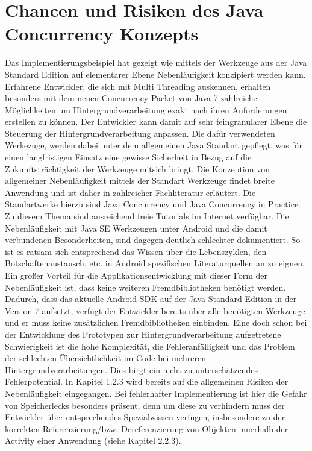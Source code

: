 \documentclass[12pt,oneside,a4paper,bibtotoc,liststotoc]{scrreprt}
\begin{document}
\section{Chancen und Risiken des Java Concurrency Konzepts}
Das Implementierungsbeispiel hat gezeigt wie mittels der Werkzeuge aus der Java Standard Edition auf elementarer Ebene Nebenläufigkeit konzipiert werden kann. Erfahrene Entwickler, die sich mit Multi Threading auskennen, erhalten besonders mit dem neuen Concurrency Packet von Java 7 zahlreiche Möglichkeiten um Hintergrundverarbeitung exakt nach ihren Anforderungen erstellen zu können. Der Entwickler kann damit auf sehr feingranularer Ebene die Steuerung der Hintergrundverarbeitung anpassen. Die dafür verwendeten Werkezuge, werden dabei unter dem allgemeinen Java Standart gepflegt, was für einen langfristigen Einsatz eine gewisse Sicherheit in Bezug auf die Zukunftsträchtigkeit der Werkzeuge mitsich bringt. Die Konzeption von allgemeiner Nebenläufigkeit mittels der Standart Werkzeuge findet breite Anwendung und ist daher in zahlreicher Fachliteratur erläutert. Die Standartwerke hierzu sind Java Concurrency und Java Concurrency in Practice.  Zu diesem Thema sind ausreichend freie Tutorials im Internet verfügbar. Die Nebenläufigkeit mit Java SE Werkzeugen unter Android und die damit verbundenen Besonderheiten, sind dagegen deutlich schlechter dokumentiert. So ist es ratsam sich entsprechend das Wissen über die Lebenszyklen, den Botschaftenaustausch, etc. in Android spezifischen Literaturquellen an zu eignen.
Ein großer Vorteil für die Applikationsentwicklung mit dieser Form der Nebenläufigkeit ist, dass keine weiteren Fremdbibliotheken benötigt werden. Dadurch, dass das aktuelle Android SDK auf der Java Standard Edition in der Version 7 aufsetzt, verfügt der Entwickler bereits über alle benötigten Werkzeuge und er muss keine zusätzlichen Fremdbibliotheken einbinden.
Eine doch schon bei der Entwicklung des Prototypen zur Hintergrundverarbeitung aufgetretene Schwierigkeit ist die hohe Komplexität, die Fehleranfälligkeit und das Problem der schlechten Übersichtlichkeit im Code bei mehreren Hintergrundverarbeitungen. Dies birgt ein nicht zu unterschätzendes Fehlerpotential. In Kapitel 1.2.3 wird bereits auf die allgemeinen Risiken der Nebenläufigkeit eingegangen. Bei fehlerhafter Implementierung ist hier die Gefahr von Speicherlecks besonders präsent, denn um diese zu verhindern muss der Entwickler über entsprechendes Spezialwissen verfügen, insbesondere zu der korrekten Referenzierung/bzw. Dereferenzierung von Objekten innerhalb der Activity einer Anwendung (siehe Kapitel 2.2.3).
\end{document}
